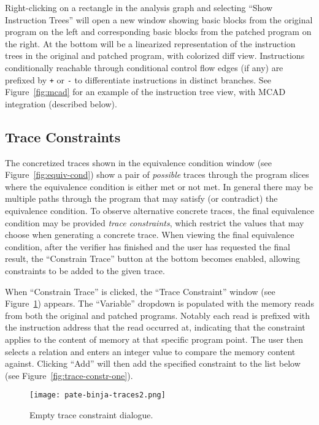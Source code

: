 Right-clicking on a rectangle in the \pate{} analysis graph and selecting ``Show Instruction Trees'' will open a new window showing basic blocks from the original program on the left and corresponding basic blocks from the patched program on the right.
At the bottom will be a linearized representation of the instruction trees in the original and patched program, with colorized diff view.
Instructions conditionally reachable through conditional control flow edges (if any) are prefixed by \texttt{+} or \texttt{-} to differentiate instructions in distinct branches.
See Figure~\ref{fig:mcad} for an example of the instruction tree view, with MCAD integration (described below).

\subsection{Trace Constraints}

The concretized traces shown in the equivalence condition window (see Figure~\ref{fig:equiv-cond}) show a pair of \emph{possible} traces
through the program slices where the equivalence condition is either met or not met. In general there may be multiple paths through
the program that may satisfy (or contradict) the equivalence condition. To observe alternative concrete traces, the final equivalence
condition may be provided \emph{trace constraints}, which restrict the values that \pate{} may choose when generating a concrete trace.
When viewing the final equivalence condition, after the verifier has finished and the user has requested the final result, the ``Constrain Trace'' 
button at the bottom becomes enabled, allowing constraints to be added to the given trace.

When ``Constrain Trace'' is clicked, the ``Trace Constraint'' window (see Figure~\ref{fig:trace-constr-empty}) appears. The
``Variable'' dropdown is populated with the memory reads from both the original and patched programs. Notably each read
is prefixed with the instruction address that the read occurred at, indicating that the constraint applies to the content
of memory at that specific program point. The user then selects a relation and enters an integer value to compare the
memory content against. Clicking ``Add'' will then add the specified constraint to the list below (see Figure~\ref{fig:trace-constr-one}).


\begin{figure}[h]
  \centering
  \texttt{[image: pate-binja-traces2.png]}
  \caption{Empty trace constraint dialogue.}
  \label{fig:trace-constr-empty}
\end{figure}

